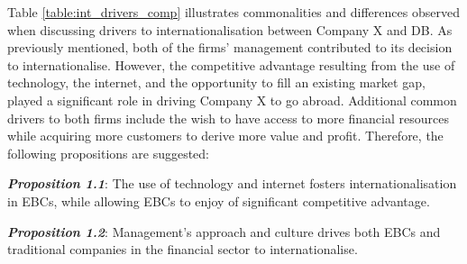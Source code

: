 \documentclass[11pt,a4paper]{article}
\begin{document}
{{{Table \ref{table:int_drivers_comp} illustrates commonalities and differences observed when discussing drivers to internationalisation between Company X and DB. As previously mentioned, both of the firms' management contributed to its decision to internationalise. However, the competitive advantage resulting from the use of technology, the internet, and the opportunity to fill an existing market gap, played a significant role in driving Company X to go abroad. Additional common drivers to both firms include the wish to have access to more financial  resources while acquiring more customers to derive more value and profit. Therefore, the following propositions are suggested:
\begin{center}
\textbf{\textit{Proposition 1.1}}: The use of technology and internet fosters internationalisation in EBCs, while allowing EBCs to enjoy of significant competitive advantage.
\end{center}
\begin{center}
\textbf{\textit{Proposition 1.2}}: Management's approach and culture drives both EBCs and traditional companies in the financial sector to internationalise.
\end{center}

}}}
\end{document}

